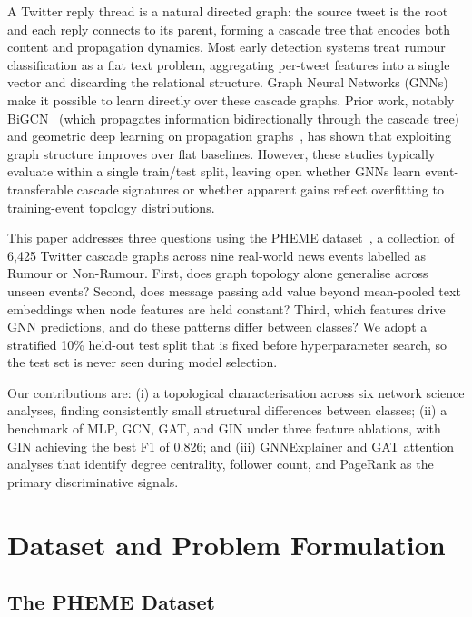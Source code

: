 \documentclass[runningheads]{llncs}
\begin{document}
A Twitter reply thread is a natural directed graph: the source tweet is the root
and each reply connects to its parent, forming a cascade tree that encodes both
content and propagation dynamics. Most early detection systems treat rumour
classification as a flat text problem, aggregating per-tweet features into a
single vector and discarding the relational structure. Graph Neural Networks
(GNNs)~\cite{kipf2017semi,velickovic2018gat} make it possible to learn directly
over these cascade graphs. Prior work, notably BiGCN~\cite{bian2020bigcn} (which propagates information
bidirectionally through the cascade tree) and geometric deep learning on
propagation graphs~\cite{monti2019fakenews}, has shown that exploiting graph
structure improves over flat baselines. However, these studies
typically evaluate within a single train/test split, leaving open whether GNNs
learn event-transferable cascade signatures or whether apparent gains reflect
overfitting to training-event topology distributions.

This paper addresses three questions using the PHEME dataset~\cite{zubiaga2016pheme},
a collection of 6{,}425 Twitter cascade graphs across nine real-world news events
labelled as Rumour or Non-Rumour. First, does graph topology alone generalise
across unseen events? Second, does message passing add value beyond
mean-pooled text embeddings when node features are held constant? Third, which
features drive GNN predictions, and do these patterns differ between classes?
We adopt a stratified 10\% held-out test split that is fixed before
hyperparameter search, so the test set is never seen during model selection.

Our contributions are: (i) a topological characterisation across six network
science analyses, finding consistently small structural differences between
classes; (ii) a benchmark of MLP, GCN, GAT, and GIN under three feature
ablations, with GIN achieving the best F1 of 0.826; and (iii) GNNExplainer and
GAT attention analyses that identify degree centrality, follower count, and
PageRank as the primary discriminative signals.

\section{Dataset and Problem Formulation}

\subsection{The PHEME Dataset}
\end{document}
